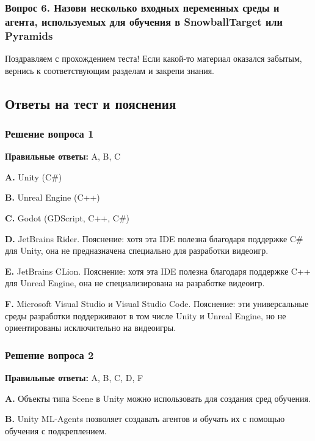 \documentclass[11pt,a4paper]{article}
\begin{document}
\subsubsection{Вопрос 6. Назови несколько входных переменных среды и агента, используемых для обучения в SnowballTarget или Pyramids}\label{q6-name-several-environment-and-agent-input-variables-used-to-train-the-agent-in-the-snowball-or-pyramid-environments}

Поздравляем с прохождением теста! Если какой-то материал оказался забытым, вернись к соответствующим разделам и закрепи знания.

\subsection{Ответы на тест и пояснения}\label{quiz-solutions-and-explanations}

\subsubsection{Решение вопроса 1}\label{q1-solution}

\textbf{Правильные ответы:} A, B, C

\textbf{A.} Unity (C\#)

\textbf{B.} Unreal Engine (C++)

\textbf{C.} Godot (GDScript, C++, C\#)

\textbf{D.} JetBrains Rider. Пояснение: хотя эта IDE полезна благодаря поддержке C\# для Unity, она не предназначена специально для разработки видеоигр.

\textbf{E.} JetBrains CLion. Пояснение: хотя эта IDE полезна благодаря поддержке C++ для Unreal Engine, она не специализирована на разработке видеоигр.

\textbf{F.} Microsoft Visual Studio и Visual Studio Code. Пояснение: эти универсальные среды разработки поддерживают в том числе Unity и Unreal Engine, но не ориентированы исключительно на видеоигры.

\subsubsection{Решение вопроса 2}\label{q2-solution}

\textbf{Правильные ответы:} A, B, C, D, F

\textbf{A.} Объекты типа Scene в Unity можно использовать для создания сред обучения.

\textbf{B.} Unity ML-Agents позволяет создавать агентов и обучать их с помощью обучения с подкреплением.
\end{document}
